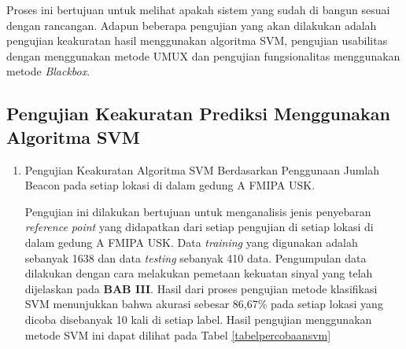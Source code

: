 \par Proses ini bertujuan untuk melihat apakah sistem yang sudah di bangun sesuai dengan rancangan. Adapun beberapa pengujian yang akan dilakukan adalah pengujian keakuratan hasil menggunakan algoritma SVM, pengujian usabilitas dengan menggunakan metode UMUX dan pengujian fungsionalitas menggunakan metode \textit{Blackbox}.

\subsection{Pengujian Keakuratan Prediksi Menggunakan Algoritma SVM}
\begin{enumerate}

	\item Pengujian Keakuratan  Algoritma SVM Berdasarkan Penggunaan Jumlah Beacon pada setiap lokasi di dalam gedung A FMIPA USK.

	      \par Pengujian ini dilakukan bertujuan untuk menganalisis jenis penyebaran \textit{reference point} yang didapatkan dari setiap pengujian di setiap lokasi di dalam gedung A FMIPA USK. Data \textit{training} yang digunakan adalah sebanyak 1638 dan data \textit{testing} sebanyak 410 data. Pengumpulan data dilakukan dengan cara melakukan pemetaan kekuatan sinyal yang telah dijelaskan pada \textbf{BAB III}. Hasil dari proses pengujian metode klasifikasi SVM menunjukkan bahwa akurasi sebesar 86,67\% pada setiap lokasi yang dicoba disebanyak 10 kali di setiap label. Hasil pengujian menggunakan metode SVM ini dapat dilihat pada Tabel \ref{tabelpercobaansvm}


\end{enumerate}
